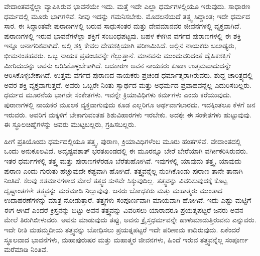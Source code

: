 ವೇದಾಂತವನ್ನೆಲ್ಲಾ ವ್ಯಾಪಿಸಿರುವ ಭಾವನೆಯೇ ಇದು. ಮತ್ತೆ ಇದೇ ಎಲ್ಲಾ ಧರ್ಮಗಳಲ್ಲಿಯೂ ಇರುವುದು. ಸಾಧಾರಣ ಧರ್ಮದಲ್ಲಿ ಮೂರು ಭಾಗಗಳಿವೆ. ನೀವು ಇದನ್ನು ಗಮನಿಸಬೇಕು. ಮೊದಲನೆಯದೆ ತತ್ತ್ವ ಸಿದ್ದಾಂತ; ಇದೇ ಧರ್ಮದ ಸಾರ. ಈ ಸಿದ್ಧಾಂತವೇ ಪುರಾಣಗಳಲ್ಲಿ ಬರುವ ಸಾಧುಸಂತರ ಮತ್ತು ದೇವಮಾನವರ ಜೀವನಗಳಲ್ಲಿ ವ್ಯಕ್ತವಾಗಿದೆ. ಪುರಾಣಗಳಲ್ಲಿ ಇರುವ ಭಾವನೆಗಳೆಲ್ಲಾ ಶಕ್ತಿಗೆ ಸಂಬಂಧಪಟ್ಟವು. ಬಹಳ ಕೆಳಗಿನ ವರ್ಗದ ಪುರಾಣಗಳಲ್ಲಿ ಈ ಶಕ್ತಿ ಇನ್ನೂ ಅನಾಗರಿಕವಾಗಿದೆ. ಅಲ್ಲಿ ಶಕ್ತಿ ಕೇವಲ ದೇಹಶಕ್ತಿಯಾಗಿ ಪರಿಣಮಿಸಿದೆ. ಅಲ್ಲಿನ ನಾಯಕರು ಬಲಾಢ್ಯರು, ಭೀಮನಂತಹವರು. ಒಬ್ಬ ನಾಯಕ ಪ್ರಪಂಚವನ್ನೇ ಗೆಲ್ಲುತ್ತಾನೆ. ಮಾನವನು ಮುಂದುವರಿದಂತೆ ದೈಹಿಕಶಕ್ತಿಗೆ ಮೀರಿದುದನ್ನು ಅವನು ಆರಿಸಿಕೊಳ್ಳಬೇಕಾಗಿದೆ. ಆದಕಾರಣ ಅವನ ನಾಯಕರು ಕೂಡಾ ಉತ್ತಮವಾದುದನ್ನೇ ಆರಿಸಿಕೊಳ್ಳಬೇಕಾಗಿದೆ. ಉತ್ತಮ ವರ್ಗದ ಪುರಾಣದ ನಾಯಕರು ಪ್ರಚಂಡ ಧರ್ಮಾತ್ಮರಾಗಿರುವರು. ಶುದ್ದ ಚಾರಿತ್ರ್ಯದಲ್ಲಿ ಅವರ ಶಕ್ತಿ ವ್ಯಕ್ತವಾಗುತ್ತದೆ. ಅವರು ಒಬ್ಬರೇ ನಿಂತು ಸ್ವಾರ್ಥದ ಮತ್ತು ಅಧರ್ಮದ ಪ್ರವಾಹವನ್ನೆಲ್ಲ ಎದುರಿಸಬಲ್ಲರು. ಧರ್ಮದ ಮೂರನೆಯ ಭಾಗವೇ ಸಂಕೇತಗಳು. ಇವನ್ನೇ ಕ್ರಿಯಾವಿಧಿಗಳು ಕರ್ಮಗಳು ಎಂದು ಕರೆಯುವುದು. ಪುರಾಣಗಳಲ್ಲಿ ನಾಯಕರ ಮೂಲಕ ವ್ಯಕ್ತವಾಗುವುದು ಕೂಡ ಎಲ್ಲರಿಗೂ ಅರ್ಥವಾಗಲಾರದು. ಇದಕ್ಕಿಂತಲೂ ಕೆಳಗೆ ಜನ ಇರುವರು. ಅವರಿಗೆ ಮಕ್ಕಳಿಗೆ ಬೇಕಾಗುವಂತಹ ಶಿಶುವಿಹಾರಗಳು ಇರಬೇಕು. ಅದಕ್ಕೇ ಈ ಸಂಕೇತಗಳು ಹುಟ್ಟುವುವು. ಈ ಸ್ಥೂಲಚಿಹ್ನೆಗಳನ್ನು ಅವರು ಮುಟ್ಟಬಲ್ಲರು, ಗ್ರಹಿಸಬಲ್ಲರು.

ಹೀಗೆ ಪ್ರತಿಯೊಂದು ಧರ್ಮದಲ್ಲಿಯೂ ತತ್ತ್ವ, ಪುರಾಣ, ಕ್ರಿಯಾವಿಧಿಗಳೆಂಬ ಮೂರು ಹಂತಗಳಿವೆ. ವೇದಾಂತದಲ್ಲಿ ಒಂದು ಅನುಕೂಲವಿದೆ. ಅದೃಷ್ಟವಶಾತ್ ಭರತಖಂಡದಲ್ಲಿ ಈ ಮೂರನ್ನೂ ಬೇರೆ ಬೇರೆಯಾಗಿ ವರ್ಗೀಕರಿಸಿರುವರು. ಇತರ ಧರ್ಮಗಳಲ್ಲಿ ತತ್ತ್ವ ಮತ್ತು ಪುರಾಣಗಳೆರಡೂ ಬೆರೆತುಹೋಗಿವೆ. ಇವುಗಳಲ್ಲಿ ಯಾವುದು ತತ್ತ್ವ, ಯಾವುದು ಪುರಾಣ ಎಂದು ಗುರುತು ಹಚ್ಚುವುದೇ ಕಷ್ಟವಾಗಿ ಹೋಗಿದೆ. ತತ್ತ್ವವನ್ನೆಲ್ಲ ನುಂಗಿಕೊಂಡು ಪುರಾಣ ತಾನೇ ತಾನಾಗಿ ನಿಂತಿದೆ. ಕೆಲವು ಶತಮಾನಗಳಾದ ಮೇಲೆ ತತ್ತ್ವದ ಸುಳಿವೇ ಸಿಕ್ಕುವುದಿಲ್ಲ. ತತ್ತ್ವವನ್ನು ವಿವರಿಸುವುದಕ್ಕೆ ಕೊಟ್ಟ ದೃಷ್ಟಾಂತಗಳೇ ತತ್ತ್ವವನ್ನು ಮರೆಮಾಡಿ ನಿಲ್ಲುವುವು. ಜನರು ಬೋಧಕರು ಮತ್ತು ಮಹಾತ್ಮರು ಮುಂತಾದ ಉದಾಹರಣೆಗಳನ್ನು ಮಾತ್ರ ನೋಡುತ್ತಾರೆ. ತತ್ತ್ವಗಳು ಸಂಪೂರ್ಣವಾಗಿ ಮಾಯವಾಗಿ ಹೋಗಿವೆ. ಇದು ಎಷ್ಟು ಮಟ್ಟಿಗೆ ಈಗ ಆಗಿದೆ ಎಂದರೆ ಕ್ರಿಸ್ತನನ್ನು ಬಿಟ್ಟು ಅವನ ತತ್ತ್ವವನ್ನು ವಿವರಿಸಲು ಯಾರಾದರೂ ಪ್ರಯತ್ನಪಟ್ಟರೆ ಜನರು ಅವನ ಮೇಲೆ ತಿರುಗಿಬೀಳುವರು. ಅವನು ಮಾಡುವುದು ತಪ್ಪು, ಅವನು ಕ್ರೈಸ್ತಧರ್ಮವನ್ನೇ ಹಾಳುಮಾಡುತ್ತಿರುವನು ಎನ್ನುವರು. ಇದೇ ರೀತಿ ಮಹಮ್ಮದೀಯ ತತ್ತ್ವವನ್ನು ಬೋಧಿಸಲು ಪ್ರಯತ್ನಪಟ್ಟರೆ ಇದೇ ಪರಿಣಾಮ ಕಾದಿರುವುದು. ಏಕೆಂದರೆ ಸ್ಥೂಲವಾದ ಭಾವನೆಗಳು, ಮಹಾಪುರುಷರ ಮತ್ತು ಮಹಾತ್ಮರ ಜೀವನಗಳು, ಹಿಂದೆ ಇರುವ ತತ್ತ್ವವನ್ನೆಲ್ಲ ಸಂಪೂರ್ಣ ಮರೆಮಾಡಿ ನಿಂತಿವೆ.

